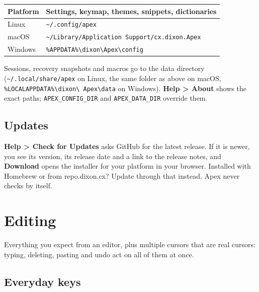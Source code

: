 \documentclass[11pt,a4paper,oneside]{report}
\newcommand{\menu}[1]{\textbf{#1}}
\begin{document}
\begin{tabularx}{\textwidth}{l X}
\toprule
\textbf{Platform} & \textbf{Settings, keymap, themes, snippets, dictionaries} \\
\midrule
Linux & \texttt{\textasciitilde/.config/apex} \\
macOS & \texttt{\textasciitilde/Library/Application Support/cx.dixon.Apex} \\
Windows & \texttt{\%APPDATA\%\textbackslash dixon\textbackslash Apex\textbackslash config} \\
\bottomrule
\end{tabularx}

Sessions, recovery snapshots and macros go to the data directory
(\texttt{\textasciitilde/.local/share/apex} on Linux, the same folder as
above on macOS, \texttt{\%LOCALAPPDATA\%\textbackslash dixon\textbackslash
Apex\textbackslash data} on Windows). \menu{Help > About} shows the exact
paths; \texttt{APEX\_CONFIG\_DIR} and \texttt{APEX\_DATA\_DIR} override them.

\section{Updates}

\menu{Help > Check for Updates} asks GitHub for the latest release. If it is
newer, you see its version, its release date and a link to the release
notes, and \textbf{Download} opens the installer for your platform in your
browser. Installed with Homebrew or from repo.dixon.cx? Update through that
instead. Apex never checks by itself.

\chapter{Editing}

\begin{nutshell}
Everything you expect from an editor, plus multiple cursors that are real
cursors: typing, deleting, pasting and undo act on all of them at once.
\end{nutshell}

\section{Everyday keys}
\end{document}
